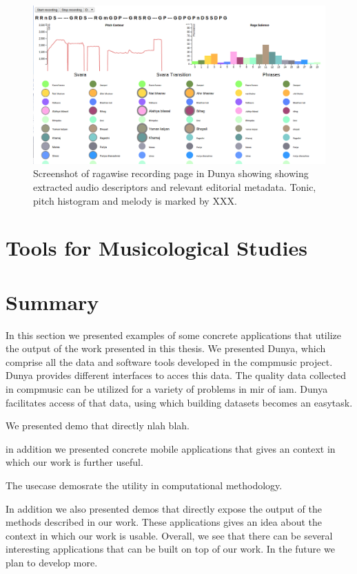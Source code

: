 \begin{figure}
	\begin{center}
		\includegraphics[width=\figSizeHundred]{ch08_applications/figures/ragawise.png}
	\end{center}
	\caption{Screenshot of \gls{ragawise} recording page in Dunya showing showing extracted audio descriptors and relevant editorial metadata. Tonic, pitch histogram and melody is marked by XXX.}
	\label{fig:dunya_recording}
\end{figure}


\section{Tools for Musicological Studies}

\section{Summary}

In this section we presented examples of some concrete applications that utilize the output of the work presented in this thesis. We presented Dunya, which comprise all the data and software tools developed in the compmusic project. Dunya provides different interfaces to acces this data. The quality data collected in compmusic can be utilized for a variety of problems in mir of iam. Dunya facilitates access of that data, using which building datasets becomes an easytask. 

We presented demo that directly nlah blah.

in addition we presented concrete mobile applications that gives an context in which our work is further useful. 

The usecase demosrate the utility in computational methodology. 


In addition we also presented demos that directly expose the output of the methods described in our work. These applications gives an idea about the context in which our work is usable. Overall, we see that there can be several interesting applications that can be built on top of our work. In the future we plan to develop more. 


